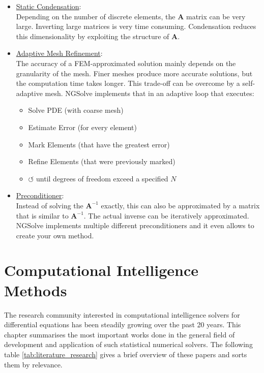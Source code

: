 \documentclass[./\jobname.tex,hidelinks]{subfiles}
\begin{document}
\begin{itemize}
	\item \underline{Static Condensation}: \\
		  Depending on the number of discrete elements, the $\mathbf{A}$ matrix can be very large. Inverting large matrices is very time consuming. Condensation reduces this dimensionality by exploiting the structure of $\mathbf{A}$. 
	\item \underline{Adaptive Mesh Refinement}: \\
		  The accuracy of a FEM-approximated solution mainly depends on the granularity of the mesh. Finer meshes produce more accurate solutions, but the computation time takes longer. This trade-off can be overcome by a self-adaptive mesh. NGSolve implements that in an adaptive loop that executes: 
		  \begin{itemize}
		  	\item Solve PDE (with coarse mesh)
		  	\item Estimate Error (for every element)
		  	\item Mark Elements (that have the greatest error)
		  	\item Refine Elements (that were previously marked)
		  	\item $\mathbf{\circlearrowleft}$  until degrees of freedom exceed a specified $N$
		  \end{itemize}
	\item \underline{Preconditioner}: \\
		  Instead of solving the $\mathbf{A}^{-1}$ exactly, this can also be approximated by a matrix that is similar to $\mathbf{A}^{-1}$. The actual inverse can be iteratively approximated. NGSolve implements multiple different preconditioners and it even allows to create your own method. 
\end{itemize}


\section{Computational Intelligence Methods} 
\label{chap:literature_overview}

The research community interested in computational intelligence solvers for differential equations has been steadily growing over the past 20 years. This chapter summarises the most important works done in the general field of development and application of such statistical numerical solvers. The following table \ref{tab:literature_research} gives a brief overview of these papers and sorts them by relevance. 
\end{document}
